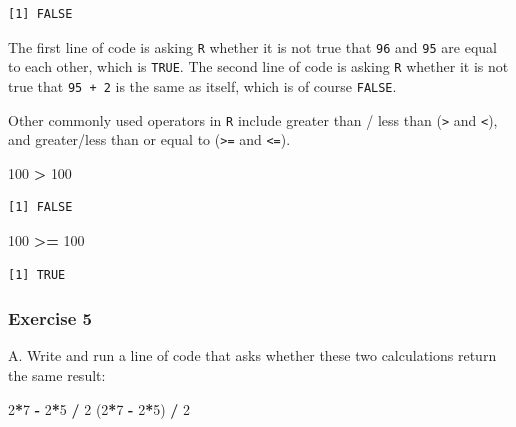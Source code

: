 \documentclass[
]{book}
\newenvironment{Shaded}{\begin{snugshade}}{\end{snugshade}}
\newcommand{\DecValTok}[1]{\textcolor[rgb]{0.00,0.00,0.81}{#1}}
\newcommand{\NormalTok}[1]{#1}
\newcommand{\OperatorTok}[1]{\textcolor[rgb]{0.81,0.36,0.00}{\textbf{#1}}}
\newcommand{\StringTok}[1]{\textcolor[rgb]{0.31,0.60,0.02}{#1}}
\begin{document}
\begin{verbatim}
[1] FALSE
\end{verbatim}

The first line of code is asking \texttt{R} whether it is not true that \texttt{96} and \texttt{95} are equal to each other, which is \texttt{TRUE}. The second line of code is asking \texttt{R} whether it is not true that \texttt{95\ +\ 2} is the same as itself, which is of course \texttt{FALSE}.

Other commonly used operators in \texttt{R} include greater than / less than (\texttt{\textgreater{}} and \texttt{\textless{}}), and greater/less than or equal to (\texttt{\textgreater{}=} and \texttt{\textless{}=}).

\begin{Shaded}
\begin{Highlighting}[]
\DecValTok{100} \OperatorTok{>}\StringTok{ }\DecValTok{100}
\end{Highlighting}
\end{Shaded}

\begin{verbatim}
[1] FALSE
\end{verbatim}

\begin{Shaded}
\begin{Highlighting}[]
\DecValTok{100} \OperatorTok{>=}\StringTok{ }\DecValTok{100}
\end{Highlighting}
\end{Shaded}

\begin{verbatim}
[1] TRUE
\end{verbatim}

\hypertarget{exercise-5}{%
\subsubsection*{Exercise 5}\label{exercise-5}}

A. Write and run a line of code that asks whether these two calculations return the same result:

\begin{Shaded}
\begin{Highlighting}[]
\DecValTok{2}\OperatorTok{*}\DecValTok{7} \OperatorTok{-}\StringTok{ }\DecValTok{2}\OperatorTok{*}\DecValTok{5} \OperatorTok{/}\StringTok{ }\DecValTok{2}
\NormalTok{(}\DecValTok{2}\OperatorTok{*}\DecValTok{7} \OperatorTok{-}\StringTok{ }\DecValTok{2}\OperatorTok{*}\DecValTok{5}\NormalTok{) }\OperatorTok{/}\StringTok{ }\DecValTok{2}
\end{Highlighting}
\end{Shaded}
\end{document}
